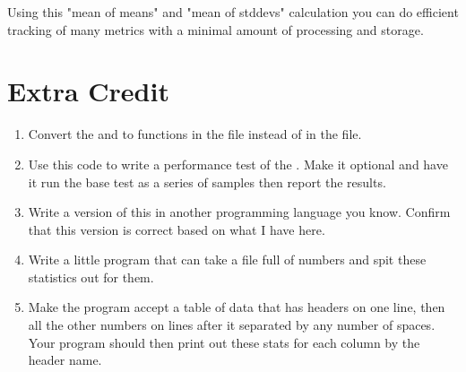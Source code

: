 Using this "mean of means" and "mean of stddevs" calculation you can do efficient
tracking of many metrics with a minimal amount of processing and storage.


\section{Extra Credit}

\begin{enumerate}
\item Convert the  and  to  functions in the  file instead of in the  file.
\item Use this code to write a performance test of the .
    Make it optional and have it run the base test as a series of samples then report
    the results.
\item Write a version of this in another programming language you know.  Confirm that this
    version is correct based on what I have here.
\item Write a little program that can take a file full of numbers and spit these statistics 
    out for them.
\item Make the program accept a table of data that has headers on one line, then all
    the other numbers on lines after it separated by any number of spaces.  Your program
        should then print out these stats for each column by the header name.
\end{enumerate}


